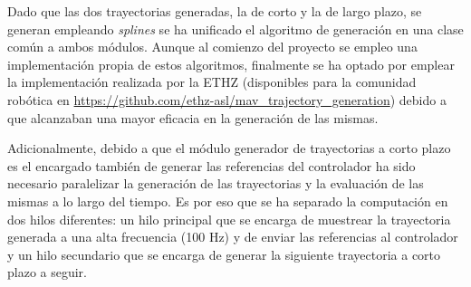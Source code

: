 Dado que las dos trayectorias generadas, la de corto y la de largo plazo, se generan empleando \textit{splines} se ha unificado el algoritmo de generación en una clase común a ambos módulos. Aunque al comienzo del proyecto se empleo una implementación propia de estos algoritmos, finalmente se ha optado por emplear la implementación realizada por la ETHZ (disponibles para la comunidad robótica en \url{https://github.com/ethz-asl/mav_trajectory_generation}) debido a que alcanzaban una mayor eficacia en la generación de las mismas.

Adicionalmente, debido a que el módulo generador de trayectorias a corto plazo es el encargado también de generar las referencias del controlador ha sido necesario paralelizar la generación de las trayectorias y la evaluación de las mismas a lo largo del tiempo. Es por eso que se ha separado la computación en dos hilos diferentes: un hilo principal que se encarga de muestrear la trayectoria generada a una alta frecuencia (100 Hz) y de enviar las referencias al controlador y un hilo secundario que se encarga de generar la siguiente trayectoria a corto plazo a seguir.





